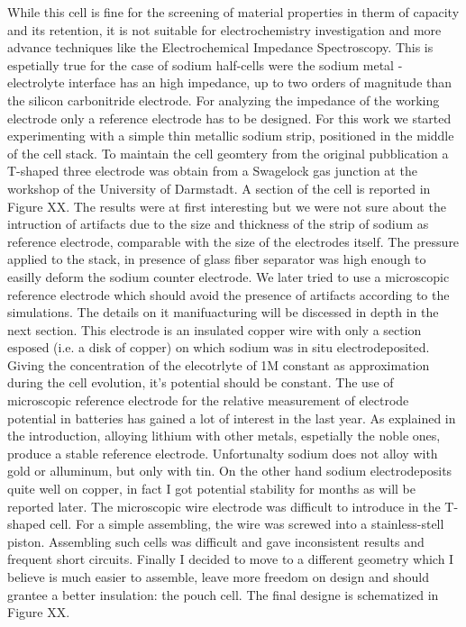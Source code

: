 While this cell is fine for the screening of material properties in therm of capacity and its retention, it is not suitable for electrochemistry investigation and more advance techniques like the Electrochemical Impedance Spectroscopy. This is espetially true for the case of sodium half-cells were the sodium metal -  electrolyte interface has an high impedance, up to two orders of magnitude than the silicon carbonitride electrode. For analyzing the impedance of the working electrode only a reference electrode has to be designed. For this work we started experimenting with a simple thin metallic sodium strip, positioned in the middle of the cell stack. To maintain the cell geomtery from the original pubblication a T-shaped three electrode was obtain from a Swagelock gas junction at the workshop of the University of Darmstadt. A section of the cell is reported in Figure XX. The results were at first interesting but we were not sure about the intruction of artifacts due to the size and thickness of the strip of sodium as reference electrode, comparable with the size of the electrodes itself. The pressure applied to the stack, in presence of glass fiber separator was high enough to easilly deform the sodium counter electrode. We later tried to use a microscopic reference electrode which should avoid the presence of artifacts according to the simulations. The details on it manifuacturing will be discessed in depth in the next section. This electrode is an insulated copper wire with only a section esposed (i.e. a disk of copper) on which sodium was in situ electrodeposited. Giving the concentration of the elecotrlyte of 1M constant as approximation during the cell evolution, it’s potential should be constant. The use of microscopic reference electrode for the relative measurement of electrode potential in batteries has gained a lot of interest in the last year. As explained in the introduction, alloying lithium with other metals, espetially the noble ones, produce a stable reference electrode. Unfortunalty sodium does not alloy with gold or alluminum, but only with tin. On the other hand sodium electrodeposits quite well on copper, in fact I got potential stability for months as will be reported later. The microscopic wire electrode was difficult to introduce in the T-shaped cell. For a simple assembling, the wire was screwed into a stainless-stell piston. Assembling such cells was difficult and gave inconsistent results and frequent short circuits. Finally I decided to move to a different geometry which I believe is much easier to assemble, leave more freedom on design and should grantee a better insulation: the pouch cell. The final designe is schematized in Figure XX.

